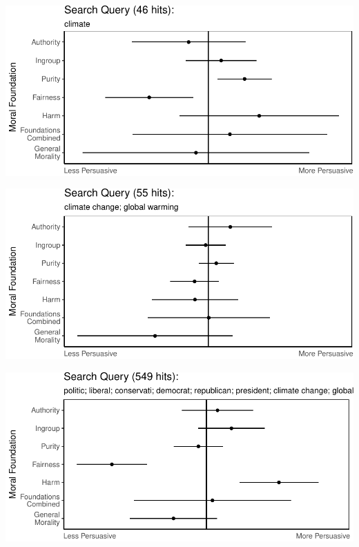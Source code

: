 \documentclass[11pt,]{article}
\begin{document}
\includegraphics{prelim_files/figure-latex/unnamed-chunk-19-1.pdf}

\includegraphics{prelim_files/figure-latex/unnamed-chunk-20-1.pdf}

\includegraphics{prelim_files/figure-latex/unnamed-chunk-21-1.pdf}




\newpage
\singlespacing 

\end{document}
